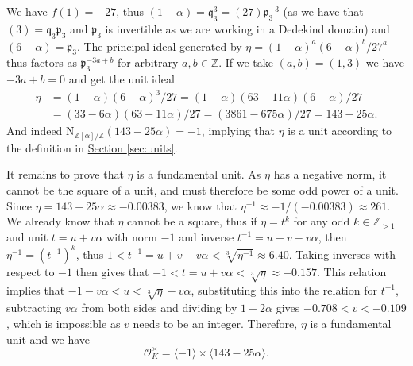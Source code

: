 \documentclass[openany, a4paper, 10pt]{book}
\theoremstyle{plain}
\theoremstyle{plain}
\theoremstyle{plain}
\theoremstyle{definition}
\theoremstyle{plain}
\theoremstyle{definition}
\theoremstyle{remark}
\newcommand{\secref}[1]{\hyperref[#1]{Section \ref{#1}}}
\begin{document}
We have $f(1) = -27$, thus $(1-\alpha) = \mathfrak q_3^3 = (27)\mathfrak p_3^{-3}$ (as we have that $(3) = \mathfrak q_3\mathfrak p_3$ and $\mathfrak p_3$ is invertible as we are working in a Dedekind domain)
and $(6-\alpha) = \mathfrak p_3$.
The principal ideal generated by
$\eta = (1-\alpha)^a (6-\alpha)^b / 27^a$ thus factors as $\mathfrak p_3^{-3a+b}$
for arbitrary $a,b \in \mathbb Z$.
If we take $(a,b) = (1,3)$ we have $-3a+b=0$ and get the unit ideal
\begin{align*}
    \eta &= (1-\alpha)(6-\alpha)^3 / 27 = (1-\alpha)(63-11\alpha)(6-\alpha) / 27 \\
         &= (33-6\alpha)(63-11\alpha) / 27 = (3861-675\alpha) / 27 = 143-25\alpha.
\end{align*}
And indeed $\mathrm{N}_{\mathbb Z[\alpha] / \mathbb Z}(143-25\alpha) = -1$, implying that $\eta$ is a unit according to the definition in \secref{sec:units}.

It remains to prove that $\eta$ is a fundamental unit.
As $\eta$ has a negative norm, it cannot be the square of a unit, and must therefore be some odd power of a unit.
Since $\eta = 143-25\alpha \approx -0.00383$, we know that $\eta^{-1} \approx -1/(-0.00383) \approx 261$.
We already know that $\eta$ cannot be a square, thus if $\eta = t^k$ for any odd $k \in \mathbb Z_{>1}$ and unit $t=u+v\alpha$ with norm $-1$ and inverse $t^{-1}=u+v-v\alpha$, then $\eta^{-1}=(t^{-1})^k$, thus $1 < t^{-1}=u+v-v\alpha < \sqrt[3]{\eta^{-1}} \approx 6.40$.
Taking inverses with respect to $-1$ then gives that $-1 < t=u+v\alpha < \sqrt[3]{\eta} \approx -0.157$.
This relation implies that
$-1-v\alpha < u < \sqrt[3]{\eta}-v\alpha$, substituting this into the relation for $t^{-1}$, subtracting $v\alpha$ from both sides and dividing by $1-2\alpha$ gives
$-0.708 < v < -0.109$, which is impossible as $v$ needs to be an integer.
Therefore, $\eta$ is a fundamental unit and we have
$$\mathcal O_K^\times = \langle -1 \rangle \times \langle 143-25\alpha \rangle.$$
\end{document}
